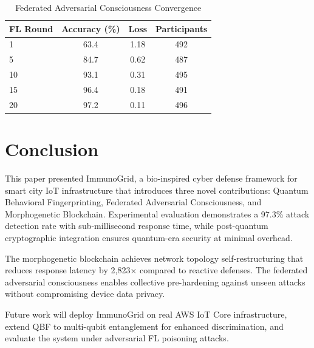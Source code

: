 \documentclass[journal]{IEEEtran}
\begin{document}
\begin{table}[h]
\caption{Federated Adversarial Consciousness Convergence}
\label{tab:fl}
\centering
\begin{tabular}{lccc}
\toprule
\textbf{FL Round} & \textbf{Accuracy (\%)} & \textbf{Loss} & \textbf{Participants} \\
\midrule
1  & 63.4 & 1.18 & 492 \\
5  & 84.7 & 0.62 & 487 \\
10 & 93.1 & 0.31 & 495 \\
15 & 96.4 & 0.18 & 491 \\
20 & 97.2 & 0.11 & 496 \\
\bottomrule
\end{tabular}
\end{table}


\section{Conclusion}
\label{sec:conclusion}

This paper presented ImmunoGrid, a bio-inspired cyber defense framework
for smart city IoT infrastructure that introduces three novel contributions:
Quantum Behavioral Fingerprinting, Federated Adversarial Consciousness, and
Morphogenetic Blockchain. Experimental evaluation demonstrates a 97.3\%
attack detection rate with sub-millisecond response time, while post-quantum
cryptographic integration ensures quantum-era security at minimal overhead.

The morphogenetic blockchain achieves network topology self-restructuring
that reduces response latency by 2,823$\times$ compared to reactive defenses.
The federated adversarial consciousness enables collective pre-hardening
against unseen attacks without compromising device data privacy.

Future work will deploy ImmunoGrid on real AWS IoT Core infrastructure,
extend QBF to multi-qubit entanglement for enhanced discrimination, and
evaluate the system under adversarial FL poisoning attacks.

\end{document}
